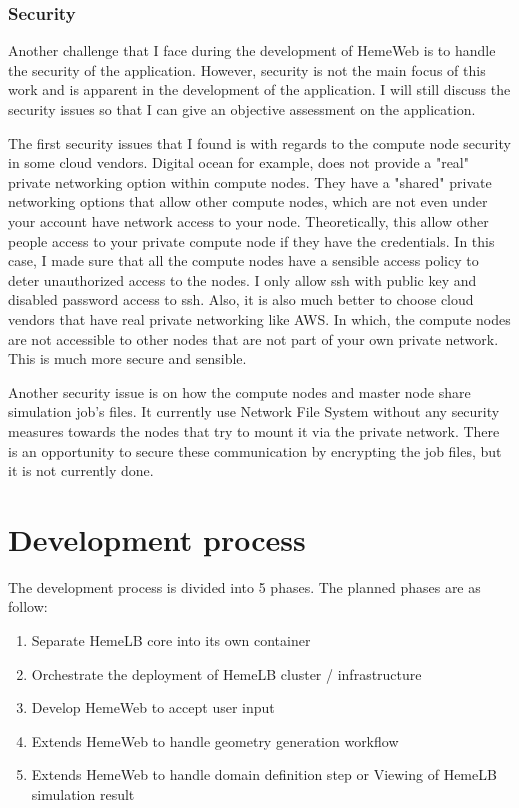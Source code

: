 \subsubsection{Security}

Another challenge that I face during the development of HemeWeb is to handle the security of the application. However, security is not the main focus of this work and is apparent in the development of the application. I will still discuss the security issues so that I can give an objective assessment on the application.

The first security issues that I found is with regards to the compute node security in some cloud vendors. Digital ocean for example, does not provide a "real" private networking option within compute nodes. They have a "shared" private networking options that allow other compute nodes, which are not even under your account have network access to your node. Theoretically, this allow other people access to your private compute node if they have the credentials. In this case, I made sure that all the compute nodes have a sensible access policy to deter unauthorized access to the nodes. I only allow ssh with public key and disabled password access to ssh. Also, it is also much better to choose cloud vendors that have real private networking like AWS. In which, the compute nodes are not accessible to other nodes that are not part of your own private network. This is much more secure and sensible.


Another security issue is on how the compute nodes and master node share simulation job's files. It currently use Network File System without any security measures towards the nodes that try to mount it via the private network. There is an opportunity to secure these communication by encrypting the job files, but it is not currently done.


\section{Development process}

The development process is divided into 5 phases. The planned phases are as follow:

\begin{enumerate}
	\item{Separate HemeLB core into its own container}
	\item{Orchestrate the deployment of HemeLB cluster / infrastructure}
	\item{Develop HemeWeb to accept user input}
	\item{Extends HemeWeb to handle geometry generation workflow}
	\item{Extends HemeWeb to handle domain definition step or Viewing of HemeLB simulation result}
\end{enumerate}

